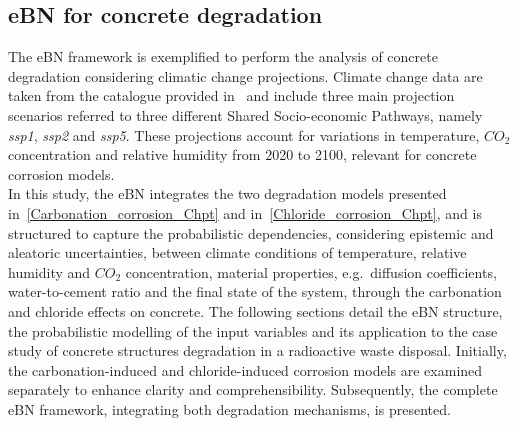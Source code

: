 \subsection{eBN for concrete degradation}
The eBN framework is exemplified to perform the analysis of concrete degradation considering climatic change projections. 
Climate change data are taken from the catalogue provided in~\textcite{Copernicus_Climate_Change} and include three main projection scenarios referred to three different Shared Socio-economic Pathways, namely \textit{ssp1}, \textit{ssp2} and \textit{ssp5}. 
These projections account for variations in temperature, $CO_2$ concentration and relative humidity from 2020 to 2100, relevant for concrete corrosion models.\\ 
In this study, the eBN integrates the two degradation models presented in~\ref{Carbonation_corrosion_Chpt} and in~\ref{Chloride_corrosion_Chpt}, and is structured to capture the probabilistic dependencies, considering epistemic and aleatoric uncertainties, between climate conditions of temperature, relative humidity and $CO_2$ concentration, material properties, e.g.~diffusion coefficients, water-to-cement ratio and the final state of the system, through the carbonation and chloride effects on concrete.
The following sections detail the eBN structure, the probabilistic modelling of the input variables and its application to the case study of concrete structures degradation in a radioactive waste disposal. 
Initially, the carbonation-induced and chloride-induced corrosion models are examined separately to enhance clarity and comprehensibility. 
Subsequently, the complete eBN framework, integrating both degradation mechanisms, is presented.

